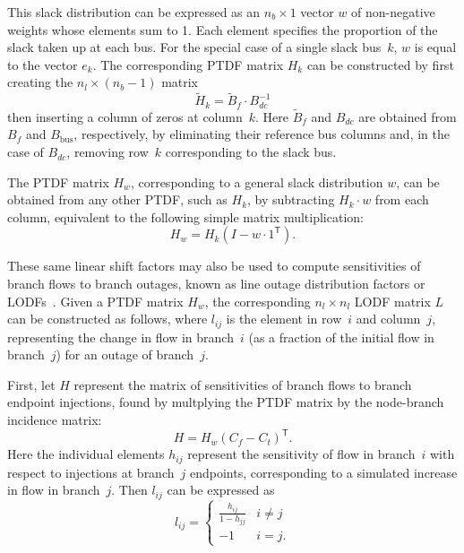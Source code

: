 \documentclass[12pt]{article}
\newcommand{\trans}[1]{{#1}^{\ensuremath{\mathsf{T}}}}  %
\numberwithin{equation}{section}
\numberwithin{table}{section}
\numberwithin{figure}{section}
\begin{document}
This slack distribution can be expressed as an $n_b \times 1$ vector $w$ of non-negative weights whose elements sum to 1. Each element specifies the proportion of the slack taken up at each bus. For the special case of a single slack bus~$k$, $w$ is equal to the vector $e_k$. The corresponding PTDF matrix $H_k$ can be constructed by first creating the $n_l \times (n_b-1)$ matrix
\begin{equation}
\widetilde{H}_k = \widetilde{B}_f \cdot B_{dc}^{-1}
\end{equation}
then inserting a column of zeros at column~$k$. Here $\widetilde B_f$ and $B_{dc}$ are obtained from $B_f$ and $B_\mathrm{bus}$, respectively, by eliminating their reference bus columns and, in the case of $B_{dc}$, removing row~$k$ corresponding to the slack bus.

The PTDF matrix $H_w$, corresponding to a general slack distribution $w$, can be obtained from any other PTDF, such as $H_k$, by subtracting $H_k \cdot w$ from each column, equivalent to the following simple matrix multiplication:
\begin{equation}
H_w = H_k (I - w \cdot \trans{1}).
\end{equation}

These same linear shift factors may also be used to compute sensitivities of branch flows to branch outages, known as line outage distribution factors or LODFs~\cite{guler2007}. Given a PTDF matrix $H_w$, the corresponding $n_l \times n_l$ LODF matrix $L$ can be constructed as follows, where $l_{ij}$ is the element in row~$i$ and column~$j$, representing the change in flow in branch~$i$ (as a fraction of the initial flow in branch~$j$) for an outage of branch~$j$.

First, let $H$ represent the matrix of sensitivities of branch flows to branch endpoint injections, found by multplying the PTDF matrix by the node-branch incidence matrix:
\begin{equation}
H = H_w \trans{(C_f - C_t)}.
\end{equation}
Here the individual elements $h_{ij}$ represent the sensitivity of flow in branch~$i$ with respect to injections at branch~$j$ endpoints, corresponding to a simulated increase in flow in branch~$j$. Then $l_{ij}$ can be expressed as
\begin{equation}
l_{ij} = \left\{\begin{array}{cc}
\displaystyle\frac{h_{ij}}{1 - h_{jj}} & i \neq j \\
-1 & i = j.
\end{array}
\right.
\end{equation}
\end{document}
